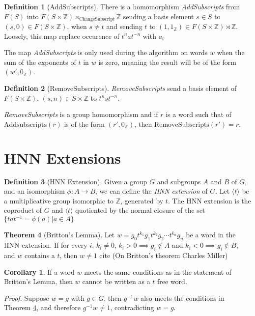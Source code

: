 \documentclass[11pt]{article} %
\theoremstyle{definition}
\newtheorem{theorem}{Theorem}[section]
\theoremstyle{definition}
\newtheorem{corol}{Corollary}[theorem]
\theoremstyle{definition}
\theoremstyle{definition}
\theoremstyle{definition}
\newtheorem{defn}[theorem]{Definition}
\theoremstyle{definition}
\begin{document}
\begin{defn}[AddSubscripts]\label{AddSubscripts}
  There is a homomorphism \textit{AddSubscripts} from $F(S)$ into $F(S \times \mathbb{Z})
  \rtimes_{\text{ChangeSubscript}} \mathbb{Z}$ sending a basis element $s \in S$ to
  $(s, 0) \in F(S \times \mathbb{Z})$, when $s \ne t$ and sending $t$ to
  $(1, 1_\mathbb{Z}) \in F(S \times \mathbb{Z}) \rtimes \mathbb{Z}$. Loosely, this map
  replace occurence of $t^n at^{-n}$ with $a_t$
\end{defn}

The map \textit{AddSubscripts} is only used during the algorithm on words $w$ when the sum of the
exponents of $t$ in $w$ is zero, meaning the result will be of the form $(w', 0_{\mathbb{Z}})$.

\begin{defn}[RemoveSubscripts]
  \textit{RemoveSubscripts} send a basis element of $F(S\times \mathbb{Z})$,  $(s, n) \in S\times \mathbb{Z}$
  to $t^n s t^{-n}$.
\end{defn}
\textit{RemoveSubscripts} is a group homomorphism and if $r$ is a word such that
of $\text{Addsubscripts}(r)$ is of the form $(r', 0_\mathbb{Z})$, then $\text{RemoveSubscripts}(r')=r$.

\section{HNN Extensions}\label{HNN}

\begin{defn}[HNN Extension]
  Given a group $G$ and subgroups $A$ and $B$ of $G$, and an isomorphism $\phi : A \to B$, we can define
  the \textit{HNN extension} of $G$. Let $\langle t \rangle$ be a multiplicative group isomorphic to
  $\mathbb{Z}$, generated by $t$. The HNN extension is the coproduct of $G$ and $\langle t \rangle$ quotiented
  by the normal closure of the set $\{ta t^{-1} = \phi(a) | a \in A\}$
\end{defn}

\begin{theorem}[Britton's Lemma]\label{britton}
  Let $w = g_0t^{k_1}g_1t^{k_2}g_2 \cdots t^{k_n}g_n$ be a word in the HNN extension.
  If for every $i$, $k_i \ne 0$, $k_i > 0 \implies g_i \notin A$ and $k_i < 0 \implies g_i \notin B$,
  and $w$ contains a $t$, then $w \ne 1$
  cite (On Britton's theorem Charles Miller)
\end{theorem}
\begin{corol}\label{genbritton}
  If a word $w$ meets the same conditions as in the statement of Britton's Lemma,
  then $w$ cannot be written as a $t$ free word.
\end{corol}
\textit{Proof.} Suppose $w = g$ with $g \in G$, then $g^{-1}w$ also meets the conditions
in Theorem \ref{britton}, and therefore $g^{-1}w \ne 1$, contradicting $w = g$.
\end{document}
